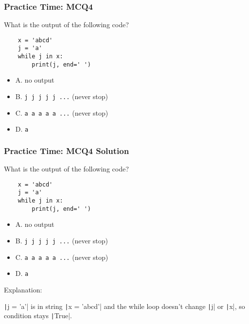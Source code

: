 \documentclass{beamer}
\begin{document}
\begin{frame}[fragile]
    \frametitle{Practice Time: MCQ4}
    What is the output of the following code?
    \begin{verbatim}
    x = 'abcd'
    j = 'a'
    while j in x:
        print(j, end=' ')
    \end{verbatim}
    \begin{itemize}
        \item A. no output
        \item B. \texttt{j j j j j ...} (never stop)
        \item C. \texttt{a a a a a ...} (never stop)
        \item D. \texttt{a}
    \end{itemize}
\end{frame}
\begin{frame}[fragile]
    \frametitle{Practice Time: MCQ4 Solution}
    What is the output of the following code?
    \begin{verbatim}
    x = 'abcd'
    j = 'a'
    while j in x:
        print(j, end=' ')
    \end{verbatim}
    \begin{itemize}
        \item A. no output
        \item B. \texttt{j j j j j ...} (never stop)
        \item \alert{C. \texttt{a a a a a ...} (never stop)}
        \item D. \texttt{a}
    \end{itemize}

    Explanation:

    \texttt|j = 'a'| is in string \texttt|x = 'abcd'|
    and the while loop doesn't change \texttt|j| or \texttt|x|,
    so condition stays \texttt|True|.
\end{frame}
\end{document}
